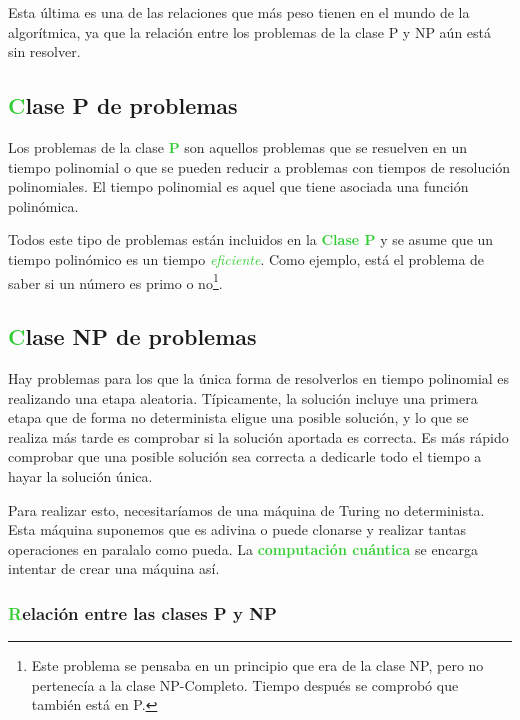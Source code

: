 \documentclass[10pt,a4paper,spanish]{report}
\theoremstyle{definition}
\theoremstyle{remark}
\begin{document}
    
    Esta última es una de las relaciones que más peso tienen en el mundo de la algorítmica, ya que la relación entre los problemas de la clase P y NP aún está sin resolver.

    \subsection{\textcolor{LimeGreen}Clase P de problemas}

    
    Los problemas de la clase \textbf{\textcolor{LimeGreen}P} son aquellos problemas que se resuelven en un tiempo polinomial o que se pueden reducir a problemas con tiempos de resolución polinomiales. El tiempo polinomial es aquel que tiene asociada una función polinómica.

    
    Todos este tipo de problemas están incluidos en la \textbf{\textcolor{LimeGreen}{Clase P}} y se asume que un tiempo polinómico es un tiempo \textit{\textcolor{LimeGreen}{eficiente}}. Como ejemplo, está el problema de saber si un número es primo o no\footnote{Este problema se pensaba en un principio que era de la clase NP, pero no pertenecía a la clase NP-Completo. Tiempo después se comprobó que también está en P.}.

    \subsection{\textcolor{LimeGreen}Clase NP de problemas}
    \label{np_prob_def}
    
    Hay problemas para los que la única forma de resolverlos en tiempo polinomial es realizando una etapa aleatoria. Típicamente, la solución incluye una primera etapa que de forma no determinista eligue una posible solución, y lo que se realiza más tarde es comprobar si la solución aportada es correcta. Es más rápido comprobar que una posible solución sea correcta a dedicarle todo el tiempo a hayar la solución única.

    
    Para realizar esto, necesitaríamos de una máquina de Turing no determinista. Esta máquina suponemos que es adivina o puede clonarse y realizar tantas operaciones en paralalo como pueda. La \textbf{\textcolor{LimeGreen}{computación cuántica}} se encarga intentar de crear una máquina así.

    \subsubsection{\textcolor{LimeGreen}Relación entre las clases P y NP}
\end{document}
